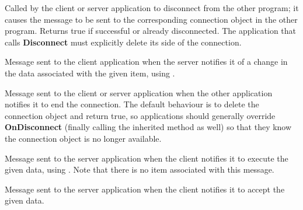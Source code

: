 
Called by the client or server application to disconnect from the
other program; it causes the  
message to be sent to the corresponding connection object in the
other program. Returns true if successful or already disconnected.
The application that calls {\bf Disconnect} must explicitly delete
its side of the connection.

\label{wxconnectiononadvise}


Message sent to the client application when the server notifies
it of a change in the data associated with the given item, using
.

\label{wxconnectionondisconnect}


Message sent to the client or server application when the other
application notifies it to end the connection. The default
behaviour is to delete the connection object and return true, so
applications should generally override {\bf OnDisconnect}
(finally calling the inherited method as well) so that they know
the connection object is no longer available.

\label{wxconnectiononexecute}


Message sent to the server application when the client notifies
it to execute the given data, using .
Note that there is no item associated with this message.

\label{wxconnectiononpoke}


Message sent to the server application when the client notifies it to
accept the given data.

\label{wxconnectiononrequest}

